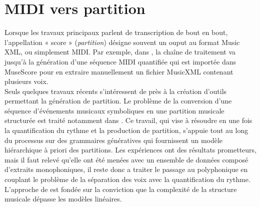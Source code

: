 \section{MIDI vers partition}
Lorsque les travaux principaux parlent de transcription de bout en bout, l’appellation « score » (\textit{partition}) désigne souvent un ouput au format Music XML, ou simplement MIDI. Par exemple, dans \cite{SHIBATA2021262}, la chaîne de traitement va jusqu’à la génération d’une séquence MIDI quantifiée qui est importée dans MuseScore pour en extraire manuellement un fichier MusicXML contenant plusieurs voix.\\
Seuls quelques travaux récents s’intéressent de près à la création d’outils permettant la génération de partition. Le problème de la conversion d'une séquence d'événements musicaux symboliques en une partition musicale structurée est traité notamment dans \cite{foscarin:hal-01988990}. Ce travail, qui vise à résoudre en une fois la quantification du rythme et la production de partition, s’appuie tout au long du processus sur  des grammaires génératives qui fournissent un modèle hiérarchique à priori des partitions. Les expériences ont des résultats prometteurs, mais il faut relevé qu’elle ont été menées avec un ensemble de données composé d'extraits monophoniques, il reste donc a traiter le passage au polyphonique en couplant le problème de la séparation des voix avec la quantification du rythme.\\
L'approche de \cite{foscarin:hal-01988990} est fondée sur la conviction que la complexité de la structure musicale dépasse les modèles linéaires.
